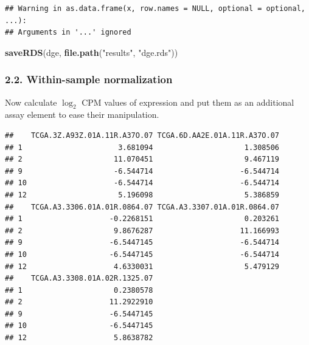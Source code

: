 \documentclass[]{article}
\newenvironment{Shaded}{\begin{snugshade}}{\end{snugshade}}
\newcommand{\KeywordTok}[1]{\textcolor[rgb]{0.13,0.29,0.53}{\textbf{{#1}}}}
\newcommand{\DataTypeTok}[1]{\textcolor[rgb]{0.13,0.29,0.53}{{#1}}}
\newcommand{\DecValTok}[1]{\textcolor[rgb]{0.00,0.00,0.81}{{#1}}}
\newcommand{\FloatTok}[1]{\textcolor[rgb]{0.00,0.00,0.81}{{#1}}}
\newcommand{\StringTok}[1]{\textcolor[rgb]{0.31,0.60,0.02}{{#1}}}
\newcommand{\OtherTok}[1]{\textcolor[rgb]{0.56,0.35,0.01}{{#1}}}
\newcommand{\NormalTok}[1]{{#1}}
\begin{document}
\begin{verbatim}
## Warning in as.data.frame(x, row.names = NULL, optional = optional, ...):
## Arguments in '...' ignored
\end{verbatim}

\begin{Shaded}
\begin{Highlighting}[]
\KeywordTok{saveRDS}\NormalTok{(dge, }\KeywordTok{file.path}\NormalTok{(}\StringTok{"results"}\NormalTok{, }\StringTok{"dge.rds"}\NormalTok{))}
\end{Highlighting}
\end{Shaded}

\subsubsection{2.2. Within-sample
normalization}\label{within-sample-normalization}

Now calculate \(\log_2\) CPM values of expression and put them as an
additional assay element to ease their manipulation.

\begin{Shaded}
\end{Shaded}

\begin{verbatim}
##    TCGA.3Z.A93Z.01A.11R.A37O.07 TCGA.6D.AA2E.01A.11R.A37O.07
## 1                      3.681094                     1.308506
## 2                     11.070451                     9.467119
## 9                     -6.544714                    -6.544714
## 10                    -6.544714                    -6.544714
## 12                     5.196098                     5.386859
##    TCGA.A3.3306.01A.01R.0864.07 TCGA.A3.3307.01A.01R.0864.07
## 1                    -0.2268151                     0.203261
## 2                     9.8676287                    11.166993
## 9                    -6.5447145                    -6.544714
## 10                   -6.5447145                    -6.544714
## 12                    4.6330031                     5.479129
##    TCGA.A3.3308.01A.02R.1325.07
## 1                     0.2380578
## 2                    11.2922910
## 9                    -6.5447145
## 10                   -6.5447145
## 12                    5.8638782
\end{verbatim}
\end{document}
